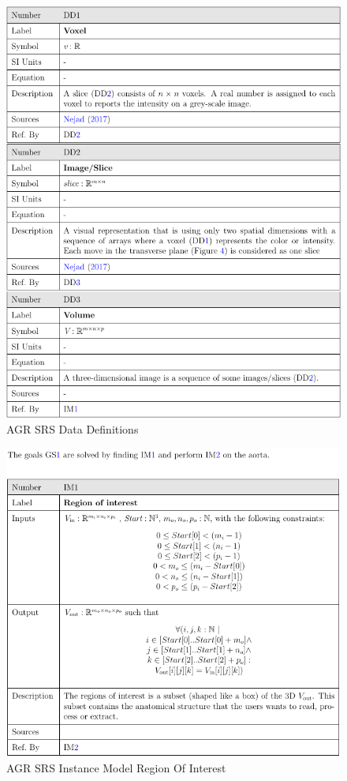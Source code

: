 \begin{itemize}
\begin{figure}[H]
    \centering
    \includegraphics[width=\textwidth]{figures/AC/SRS/DD.png}
    \caption[AGR SRS Data Definitions]{AGR SRS Data Definitions}
    \label{fig_agr_dd}
\end{figure}

\begin{figure}[H]
    \centering
    \includegraphics[width=\textwidth]{figures/AC/SRS/im1.png}
    \caption[AGR SRS Instance Model Region Of Interest]{AGR SRS Instance Model Region Of Interest}
    \label{fig_agr_im1}
\end{figure}


\end{itemize}
